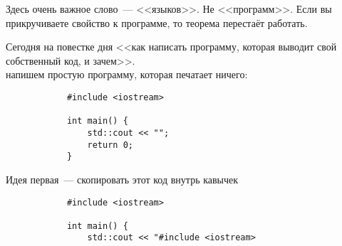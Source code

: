 \documentclass{article}
\begin{document}
    \begin{remark}
        Здесь очень важное слово~--- <<языков>>. Не <<программ>>. Если вы прикручиваете свойство к программе, то теорема перестаёт работать.
    \end{remark}
    \begin{remark}
        Сегодня на повестке дня <<как написать программу, которая выводит свой собственный код, и зачем>>.\\
        напишем простую программу, которая печатает ничего:
        \begin{verbatim}
            #include <iostream>
            
            int main() {
                std::cout << "";
                return 0;
            }
        \end{verbatim}
        Идея первая~--- скопировать этот код внутрь кавычек
        \begin{verbatim}
            #include <iostream>
            
            int main() {
                std::cout << "#include <iostream>
                

\end{verbatim}
\end{remark}
\end{document}
